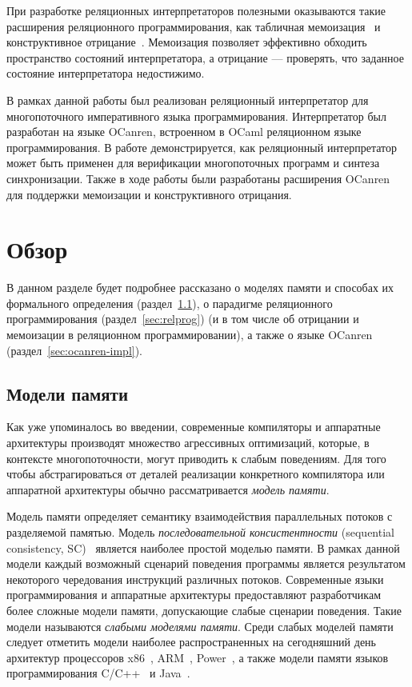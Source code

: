 При разработке реляционных интерпретаторов полезными оказываются такие расширения 
реляционного программирования, как табличная мемоизация~\cite{swift2012xsb, schrijvers2008tchr}
и конструктивное отрицание~\cite{chan1988constructive, przymusinski1989constructive, stuckey1991constructive, liu1999constructive}.
Мемоизация позволяет эффективно обходить пространство состояний интерпретатора,
а отрицание --- проверять, что заданное состояние интерпретатора недостижимо.

В рамках данной работы был реализован реляционный интерпретатор
для многопоточного императивного языка программирования.
Интерпретатор был разработан на языке OCanren, 
встроенном в OCaml реляционном языке программирования.
В работе демонстрируется, как реляционный интерпретатор
может быть применен для верификации многопоточных программ 
и синтеза синхронизации.
Также в ходе работы были разработаны расширения OCanren для 
поддержки мемоизации и конструктивного отрицания.

\section{Обзор}

В данном разделе будет подробнее рассказано о 
моделях памяти и способах их формального определения (раздел~\ref{sec:mem-model}),
о парадигме реляционного программирования (раздел~\ref{sec:relprog})
(и в том числе об отрицании и мемоизации в реляционном программировании),
а также о языке OCanren (раздел~\ref{sec:ocanren-impl}).

\subsection{Модели памяти}

\label{sec:mem-model}

Как уже упоминалось во введении,
современные компиляторы и аппаратные архитектуры производят множество 
агрессивных оптимизаций, которые, в контексте многопоточности, 
могут приводить к слабым поведениям.
Для того чтобы абстрагироваться от деталей реализации конкретного 
компилятора или аппаратной архитектуры обычно рассматривается 
\emph{модель памяти}.

Модель памяти определяет семантику взаимодействия 
параллельных потоков с разделяемой памятью.
Модель \emph{последовательной консистентности} 
(sequential consistency, SC)~\cite{lamport1979make} 
является наиболее простой моделью памяти.
В рамках данной модели каждый возможный сценарий поведения программы 
является результатом некоторого чередования инструкций различных потоков.
Современные языки программирования и аппаратные архитектуры 
предоставляют разработчикам более сложные модели памяти,
допускающие слабые сценарии поведения.
Такие модели называются \emph{слабыми моделями памяти}.
Среди слабых моделей памяти следует отметить
модели наиболее распространенных на сегодняшний день архитектур процессоров
x86~\cite{sewell2010x86}, ARM~\cite{flur2016modelling}, Power~\cite{sarkar2011understanding},
а также модели памяти языков программирования 
C/C++~\cite{batty2011mathematizing} и Java~\cite{manson2005java}.

